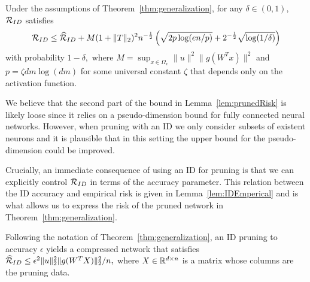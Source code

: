 \begin{lemma}
\label{lem:prunedRisk}
Under the assumptions of Theorem~\ref{thm:generalization}, for any $\delta\in(0,1)$, $\mathcal{R}_{ID}$ satisfies  
\begin{equation*}
    \mathcal{R}_{ID} 
    \leq \widehat{\mathcal{R}}_{ID} + M(1+\|T\|_2)^2n^{-\frac{1}{2}} 
     \left( \sqrt{2p\log(en/p)}+ 2^{-\frac{1}{2}}\sqrt{\log (1/\delta)}\right)
\end{equation*}
with probability $1-\delta,$ where $M = \sup_{x\in\Omega_x} \|u\| ^2 \| g(W^T x)\|^2$ and $p=\zeta dm \log (dm)$ for some universal constant $\zeta$ that depends only on the activation function.
\end{lemma}
\begin{remarks}
We believe that the second part of the bound in Lemma~\ref{lem:prunedRisk} is likely loose since it relies on a pseudo-dimension bound for fully connected neural networks. However, when pruning with an ID we only consider subsets of existent neurons and it is plausible that in this setting the upper bound for the pseudo-dimension could be improved.
\end{remarks}

Crucially, an immediate consequence of using an ID for pruning is that we can explicitly control $\mathcal{R}_{ID}$ in terms of the accuracy parameter. This relation between the ID accuracy and empirical risk is given in Lemma~\ref{lem:IDEmperical} and is what allows us to express the risk of the pruned network in Theorem~\ref{thm:generalization}. 

\begin{lemma}
\label{lem:IDEmperical} Following the notation of Theorem~\ref{thm:generalization}, an ID pruning to accuracy $\epsilon$ yields a compressed network that satisfies
$\widehat{\mathcal{R}}_{ID} \leq  \epsilon^2 \|u\|_2^2 \| g(W^T X)\|_2^2 / n,$
where $X\in\mathbb{R}^{d\times n}$ is a matrix whose columns are the pruning data.
\end{lemma}



